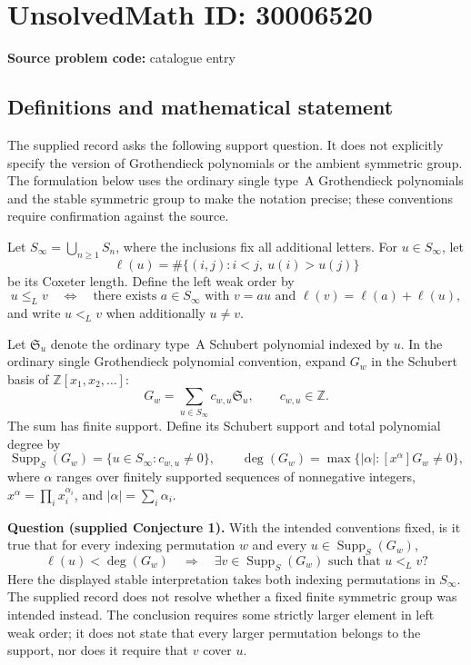 \documentclass[11pt]{article}
\newcommand{\Z}{\mathbb{Z}}
\begin{document}
\section*{UnsolvedMath ID: 30006520}
\textbf{Source problem code:} catalogue entry
\subsection{Definitions and mathematical statement}
The supplied record asks the following support question. It does not explicitly specify the version of Grothendieck polynomials or the ambient symmetric group. The formulation below uses the ordinary single type~A Grothendieck polynomials and the stable symmetric group to make the notation precise; these conventions require confirmation against the source.

Let \(S_\infty=\bigcup_{n\geq 1}S_n\), where the inclusions fix all additional letters. For \(u\in S_\infty\), let
\[
\ell(u)=\#\{(i,j):i<j,\ u(i)>u(j)\}
\]
be its Coxeter length. Define the left weak order by
\[
u\leq_L v
\quad\Longleftrightarrow\quad
\text{there exists }a\in S_\infty\text{ with }v=au
\text{ and }\ell(v)=\ell(a)+\ell(u),
\]
and write \(u<_L v\) when additionally \(u\ne v\).

Let \(\mathfrak S_u\) denote the ordinary type~A Schubert polynomial indexed by \(u\). In the ordinary single Grothendieck polynomial convention, expand \(G_w\) in the Schubert basis of \(\Z[x_1,x_2,\ldots]\):
\[
G_w=\sum_{u\in S_\infty}c_{w,u}\mathfrak S_u,
\qquad c_{w,u}\in\Z.
\]
The sum has finite support. Define its Schubert support and total polynomial degree by
\[
\operatorname{Supp}_S(G_w)=\{u\in S_\infty:c_{w,u}\ne0\},
\qquad
\deg(G_w)=\max\{|\alpha|:[x^\alpha]G_w\ne0\},
\]
where \(\alpha\) ranges over finitely supported sequences of nonnegative integers, \(x^\alpha=\prod_i x_i^{\alpha_i}\), and \(|\alpha|=\sum_i\alpha_i\).

\textbf{Question (supplied Conjecture 1).} With the intended conventions fixed, is it true that for every indexing permutation \(w\) and every \(u\in\operatorname{Supp}_S(G_w)\),
\[
\ell(u)<\deg(G_w)
\quad\Longrightarrow\quad
\exists v\in\operatorname{Supp}_S(G_w)\text{ such that }u<_L v?
\]
Here the displayed stable interpretation takes both indexing permutations in \(S_\infty\). The supplied record does not resolve whether a fixed finite symmetric group was intended instead. The conclusion requires some strictly larger element in left weak order; it does not state that every larger permutation belongs to the support, nor does it require that \(v\) cover \(u\).
\end{document}
